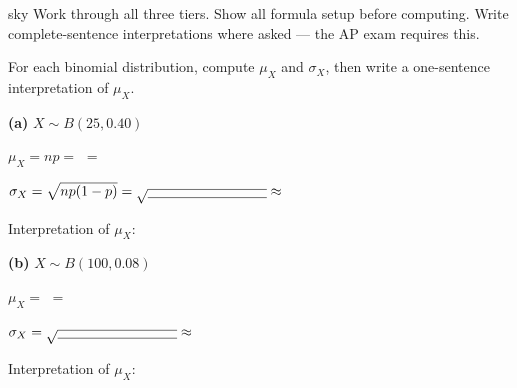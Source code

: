 \documentclass[10pt]{article}
\begin{document}
\namepartnerperiod

\vspace{0.1in}

\begin{scenariobox}[Directions]{sky}
\small
Work through all three tiers. Show all formula setup before computing. Write
complete-sentence interpretations where asked --- the AP exam requires this.
\end{scenariobox}

\vspace{0.1in}

\begin{tcolorbox}[colback=goldbg, colframe=goldacc, boxrule=1pt, arc=2mm,
    title={\bfseries Tier R \quad Remediate: Computing Mean and SD},
    fonttitle=\small]
\small

For each binomial distribution, compute $\mu_X$ and $\sigma_X$, then write a
one-sentence interpretation of $\mu_X$.

\vspace{10pt}
\textbf{(a)} $X \sim B(25, 0.40)$

\vspace{4pt}
$\mu_X = np = $ \blank{5cm} $= $ \blank{2cm}

$\sigma_X = \sqrt{np(1-p)} = \sqrt{\blank{3cm}} \approx$ \blank{2cm}

Interpretation of $\mu_X$: \writeline\\[1pt]\writeline

\vspace{12pt}
\textbf{(b)} $X \sim B(100, 0.08)$

\vspace{4pt}
$\mu_X = $ \blank{5cm} $= $ \blank{2cm}

$\sigma_X = \sqrt{\blank{3cm}} \approx$ \blank{2cm}

Interpretation of $\mu_X$: \writeline\\[1pt]\writeline
\vspace{4pt}
\end{tcolorbox}

\vspace{0.1in}
\end{document}
